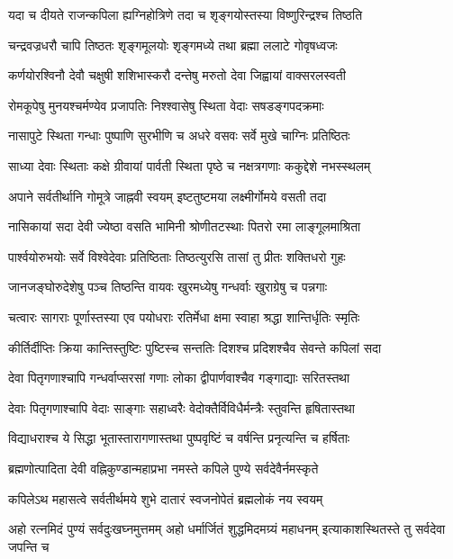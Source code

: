 \twolineshloka
{यदा च दीयते राजन्कपिला ह्यग्निहोत्रिणे}
{तदा च शृङ्गयोस्तस्या विष्णुरिन्द्रश्च तिष्ठति}


\twolineshloka
{चन्द्रवज्रधरौ चापि तिष्ठतः शृङ्गमूलयोः}
{शृङ्गमध्ये तथा ब्रह्मा ललाटे गोवृषध्वजः}


\twolineshloka
{कर्णयोरश्विनौ देवौ चक्षुषी शशिभास्करौ}
{दन्तेषु मरुतो देवा जिह्वायां वाक्सरलस्वती}


\twolineshloka
{रोमकूपेषु मुनयश्चर्मण्येव प्रजापतिः}
{निश्श्वासेषु स्थिता वेदाः सषडङ्गपदक्रमाः}


\twolineshloka
{नासापुटे स्थिता गन्धाः पुष्पाणि सुरभीणि च}
{अधरे वसवः सर्वे मुखे चाग्निः प्रतिष्ठितः}


\twolineshloka
{साध्या देवाः स्थिताः कक्षे ग्रीवायां पार्वती स्थिता}
{पृष्ठे च नक्षत्रगणाः ककुद्देशे नभस्स्थलम्}


\twolineshloka
{अपाने सर्वतीर्थानि गोमूत्रे जाह्नवी स्वयम्}
{इष्टतुष्टमया लक्ष्मीर्गोमये वसती तदा}


\twolineshloka
{नासिकायां सदा देवी ज्येष्ठा वसति भामिनी}
{श्रोणीतटस्थाः पितरो रमा लाङ्गूलमाश्रिता}


\twolineshloka
{पार्श्वयोरुभयोः सर्वे विश्वेदेवाः प्रतिष्ठिताः}
{तिष्ठत्युरसि तासां तु प्रीतः शक्तिधरो गुहः}


\twolineshloka
{जानजङ्घोरुदेशेषु पञ्च तिष्ठन्ति वायवः}
{खुरमध्येषु गन्धर्वाः खुराग्रेषु च पन्नगाः}


\threelineshloka
{चत्वारः सागराः पूर्णास्तस्या एव पयोधराः}
{रतिर्मेधा क्षमा स्वाहा श्रद्धा शान्तिर्धृतिः स्मृतिः}
{}


\twolineshloka
{कीर्तिर्दीप्तिः क्रिया कान्तिस्तुष्टिः पुष्टिस्च सन्ततिः}
{दिशश्च प्रदिशश्चैव सेवन्ते कपिलां सदा}


\twolineshloka
{देवा पितृगणाश्चापि गन्धर्वाप्सरसां गणाः}
{लोका द्वीपार्णवाश्चैव गङ्गाद्याः सरितस्तथा}


\twolineshloka
{देवाः पितृगणाश्चापि वेदाः साङ्गाः सहाध्वरैः}
{वेदोक्तैर्विविधैर्मन्त्रैः स्तुवन्ति हृषितास्तथा}


\twolineshloka
{विद्याधराश्च ये सिद्धा भूतास्तारागणास्तथा}
{पुष्पवृष्टिं च वर्षन्ति प्रनृत्यन्ति च हर्षिताः}


\twolineshloka
{ब्रह्मणोत्पादिता देवी वह्निकुण्डान्महाप्रभा}
{नमस्ते कपिले पुण्ये सर्वदेवैर्नमस्कृते}


\twolineshloka
{कपिलेऽथ महासत्वे सर्वतीर्थमये शुभे}
{दातारं स्वजनोपेतं ब्रह्मलोकं नय स्वयम्}


\threelineshloka
{अहो रत्नमिदं पुण्यं सर्वदुःखघ्नमुत्तमम्}
{अहो धर्मार्जितं शुद्धमिदमग्र्यं महाधनम्}
{इत्याकाशस्थितस्ते तु सर्वदेवा जपन्ति च}


